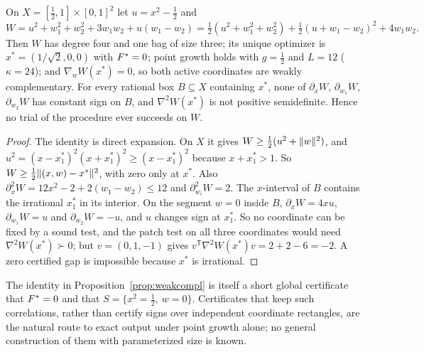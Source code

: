 \begin{proposition}\label{prop:weakcompl}
On $X=[\frac12,1]\times[0,1]^2$ let $u=x^2-\frac12$ and
\[
W=u^2+w_1^2+w_2^2+3w_1w_2+u(w_1-w_2)
=\tfrac12(u^2+w_1^2+w_2^2)+\tfrac12(u+w_1-w_2)^2+4w_1w_2 .
\]
Then $W$ has degree four and one bag of size three; its unique optimizer is
$x^*=(1/\sqrt2,0,0)$ with $F^*=0$; point growth holds with $g=\frac12$ and
$L=12$ ($\kappa=24$); and $\nabla_wW(x^*)=0$, so both active coordinates are
weakly complementary. For every rational box $B\subseteq X$ containing $x^*$,
none of $\partial_xW$, $\partial_{w_1}W$, $\partial_{w_2}W$ has constant sign on
$B$, and $\nabla^2W(x^*)$ is not positive semidefinite. Hence no trial of the
procedure ever succeeds on $W$.
\end{proposition}

\begin{proof}
The identity is direct expansion. On $X$ it gives $W\ge\frac12(u^2+\lVert w\rVert^2)$,
and $u^2=(x-x^*_1)^2(x+x^*_1)^2\ge(x-x^*_1)^2$ because $x+x^*_1>1$. So
$W\ge\frac12\lVert(x,w)-x^*\rVert^2$, with zero only at $x^*$. Also
$\partial_x^2W=12x^2-2+2(w_1-w_2)\le12$ and $\partial_{w_i}^2W=2$. The
$x$-interval of $B$ contains the irrational $x^*_1$ in its interior. On the
segment $w=0$ inside $B$, $\partial_xW=4xu$, $\partial_{w_1}W=u$ and
$\partial_{w_2}W=-u$, and $u$ changes sign at $x^*_1$. So no coordinate can be
fixed by a sound test, and the patch test on all three coordinates would
need $\nabla^2W(x^*)\succ0$; but $v=(0,1,-1)$ gives
$v^{\mathsf T}\nabla^2W(x^*)v=2+2-6=-2$. A zero certified gap is impossible
because $x^*$ is irrational.
\end{proof}

The identity in Proposition~\ref{prop:weakcompl} is itself a short global
certificate that $F^*=0$ and that $S=\{x^2=\frac12,\ w=0\}$. Certificates
that keep such correlations, rather than certify signs over independent
coordinate rectangles, are the natural route to exact output under point
growth alone; no general construction of them with parameterized size is
known.
